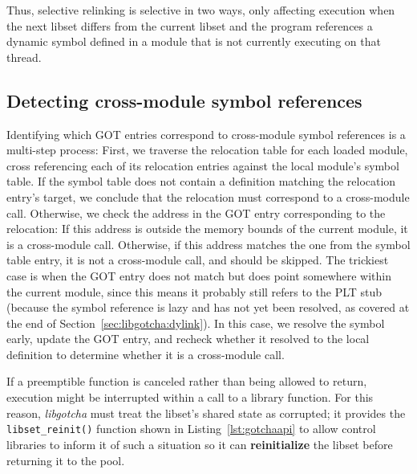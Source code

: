 \begin{promotesubsections}




\end{promotesubsections}

Thus, selective relinking is selective in two ways, only affecting execution when the
next libset differs from the current libset and the program references a dynamic
symbol defined in a module that is not currently executing on that thread.


\subsection{Detecting cross-module symbol references}

Identifying which GOT entries correspond to cross-module symbol references is a
multi-step process:
First, we traverse the relocation table for each loaded module, cross referencing
each of its relocation entries against the local module's symbol table.  If the
symbol table does not contain a definition matching the relocation entry's target, we
conclude that the relocation must correspond to a cross-module call.  Otherwise, we
check the address in the GOT entry corresponding to the relocation:  If this address
is outside the memory bounds of the current module, it is a cross-module call.
Otherwise, if this address matches the one from the symbol table entry, it is not a
cross-module call, and should be skipped.  The trickiest case is when the GOT entry
does not match but does point somewhere within the current module, since this means
it probably still refers to the PLT stub (because the symbol reference is lazy and
has not yet been resolved, as covered at the end of
Section~\ref{sec:libgotcha:dylink}).  In this case, we resolve the symbol early,
update the GOT entry, and recheck whether it resolved to the local definition to
determine whether it is a cross-module call.


\begin{promotesubsections}

\end{promotesubsections}

If a preemptible function is canceled rather than being allowed to return, execution
might be interrupted within a call to a library function.  For this reason,
\textit{libgotcha} must treat the libset's shared state as corrupted; it provides the
\texttt{libset\_reinit()} function shown in Listing~\ref{lst:gotchaapi} to allow
control libraries to inform it of such a situation so it can \textbf{reinitialize}
the libset before returning it to the pool.

